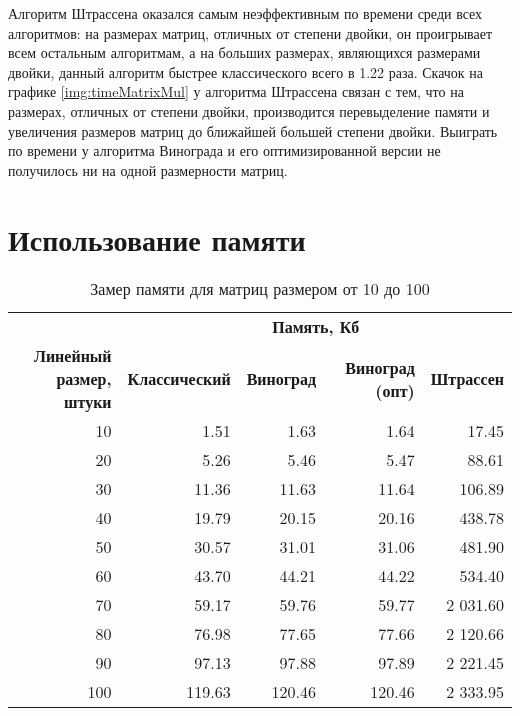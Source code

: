 Алгоритм Штрассена оказался самым неэффективным по времени среди всех алгоритмов: на размерах матриц, отличных от степени двойки, он проигрывает всем остальным алгоритмам, а на больших размерах, являющихся размерами двойки, данный алгоритм быстрее классического всего в 1.22 раза.
Скачок на графике \ref{img:timeMatrixMul} у алгоритма Штрассена связан с тем, что на размерах, отличных от степени двойки, производится перевыделение памяти и увеличения размеров матриц до ближайшей большей степени двойки. Выиграть по времени у алгоритма Винограда и его оптимизированной версии не получилось ни на одной размерности матриц.

\section{Использование памяти}

\begin{table}[ht]
	\small
	\begin{center}
		\begin{threeparttable}
			\caption{Замер памяти для матриц размером от 10 до 100}
			\label{tbl:mem}
			\begin{tabular}{|r|r|r|r|r|}
				\hline
				& \multicolumn{4}{c|}{\bfseries Память, Кб} \\ \cline{2-5}
				\bfseries \makecell{Линейный размер, \\ штуки} & \bfseries Классический & \bfseries Виноград & \bfseries Виноград (опт) & \bfseries Штрассен  \\ \cline{2-5}
				\hline
				10 & 1.51 & 1.63 & 1.64 & 17.45 \\
				\hline
				20 & 5.26 & 5.46 & 5.47 & 88.61 \\
				\hline
				30 & 11.36 & 11.63 & 11.64 & 106.89 \\
				\hline
				40 & 19.79 & 20.15 & 20.16 & 438.78 \\
				\hline
				50 & 30.57 & 31.01 & 31.06 & 481.90 \\
				\hline
				60 &  43.70 & 44.21 & 44.22 & 534.40 \\
				\hline
				70 & 59.17 & 59.76 & 59.77 & 2 031.60 \\
				\hline
				80 & 76.98 & 77.65 & 77.66 & 2 120.66 \\
				\hline
				90 & 97.13 & 97.88 & 97.89 & 2 221.45 \\
				\hline
				100 & 119.63 & 120.46 & 120.46 & 2 333.95 \\
				\hline
			\end{tabular}	
		\end{threeparttable}
	\end{center}
\end{table}

